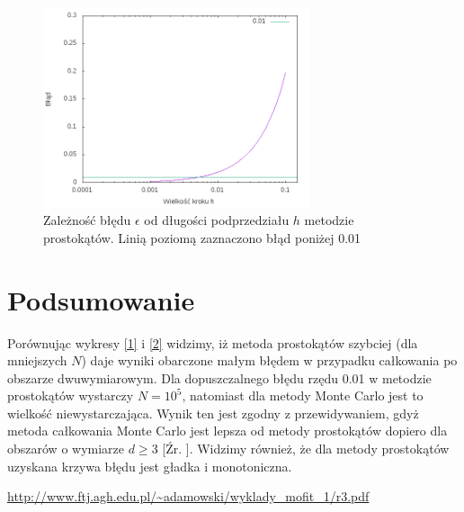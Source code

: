 \documentclass[11pt]{article}
\begin{document}
\begin{figure} 
\centering
\includegraphics[width=0.7\textwidth]{PRST3.png}
\caption{Zależność błędu $\epsilon$ od długości podprzedziału $h$ metodzie prostokątów. 
	Linią poziomą zaznaczono błąd poniżej 0.01}\label{3}
\end{figure}
\section*{Podsumowanie}
Porównując wykresy \ref{1} i \ref{2} widzimy, iż metoda prostokątów szybciej (dla mniejszych $N$) daje wyniki obarczone małym błędem w przypadku
całkowania po obszarze dwuwymiarowym. Dla dopuszczalnego błędu rzędu 0.01 w metodzie prostokątów wystarczy $N=10^5$, natomiast dla metody
Monte Carlo jest to wielkość niewystarczająca. Wynik ten jest zgodny z przewidywaniem, gdyż metoda całkowania Monte Carlo jest lepsza od metody prostokątów
dopiero dla obszarów o wymiarze $d \ge 3$ [Źr. \cite{11}]. Widzimy również, że dla metody prostokątów uzyskana krzywa błędu jest gładka i monotoniczna.

\begin{thebibliography}{9}
    \url{http://www.ftj.agh.edu.pl/~adamowski/wyklady_mofit_1/r3.pdf}
\end{thebibliography}
\end{document}
